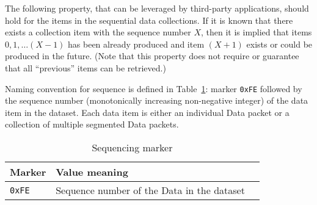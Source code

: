 The following property, that can be leveraged by third-party applications, should hold for the items in the sequential data collections.
If it is known that there exists a collection item with the sequence number $X$, then it is implied that items $0, 1, \ldots (X-1)$ has been already produced and item $(X+1)$ exists or could be produced in the future.
(Note that this property does not require or guarantee that all ``previous'' items can be retrieved.)

Naming convention for sequence is defined in Table~\ref{tab:sequencing}: marker \verb|0xFE| followed by the sequence number (monotonically increasing non-negative integer) of the data item in the dataset.
Each data item is either an individual Data packet or a collection of multiple segmented Data packets.

\begin{table}[h!]
  \centering
  \caption{Sequencing marker}
  \label{tab:sequencing}
  \begin{tabular}{|l|l|l|}
    \hline
    Marker & Value meaning \\
    \hline \hline
    \verb|0xFE| & Sequence number of the Data in the dataset \\
    \hline
  \end{tabular}
\end{table}


